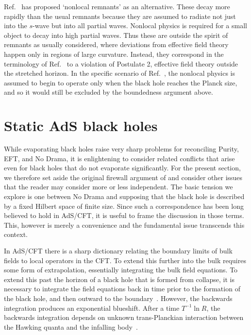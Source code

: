 \documentclass[12pt]{article}
\newcommand{\sect}[1]{\section{#1}\setcounter{equation}{0}}
\begin{document}
{{Ref.~\cite{Strominger:2009aj} has proposed `nonlocal remnants' as an alternative.  These decay more rapidly than the usual remnants because they are assumed to radiate not just into the $s$-wave but into all partial waves.  Nonlocal physics is required for a small object to decay into high partial waves.  Thus these are outside the spirit of remnants as usually considered, where deviations from effective field theory happen only in regions of large curvature.  Instead, they correspond in the terminology of Ref.~\cite{Almheiri:2012rt} to a violation of Postulate 2, effective field theory outside the stretched horizon.  In the specific scenario of Ref.~\cite{Strominger:2009aj}, the nonlocal physics is assumed to begin to operate only when the black hole reaches the Planck size, and so it would still be excluded by the boundedness argument above.







\sect{Static AdS black holes}
\label{intF}

While evaporating black holes raise very sharp problems for reconciling
Purity, EFT, and No Drama, it is enlightening to consider related conflicts that arise even for black holes that do not evaporate significantly.  For the present section, we therefore set aside the original firewall argument of \cite{Almheiri:2012rt} and consider other issues that the reader may consider more or less independent.  The basic tension we explore is one between No Drama and supposing that the black hole is described by a fixed Hilbert space of finite size. Since such a correspondence has been long believed to hold in AdS/CFT, it is useful to frame the discussion in those terms.  This, however is merely a convenience and the fundamental issue transcends this context.


In AdS/CFT there is a sharp dictionary relating the boundary limits of bulk fields to local operators in the CFT.  To extend this further into the bulk requires some form of extrapolation, essentially integrating the bulk field equations.  To extend this past the horizon of a black hole that is formed from collapse, it is necessary to integrate the field equations back in time prior to the formation of the black hole, and then outward to the boundary~\cite{Freivogel:2004rd,Heemskerk:2012mn}.  However, the backwards integration produces an exponential blueshift.  After a time $T^{-1} \ln R$, the backwards integration depends on unknown trans-Planckian interaction  between the Hawking quanta and the infalling body~\cite{Susskind:2012uw}.

}}
\end{document}

